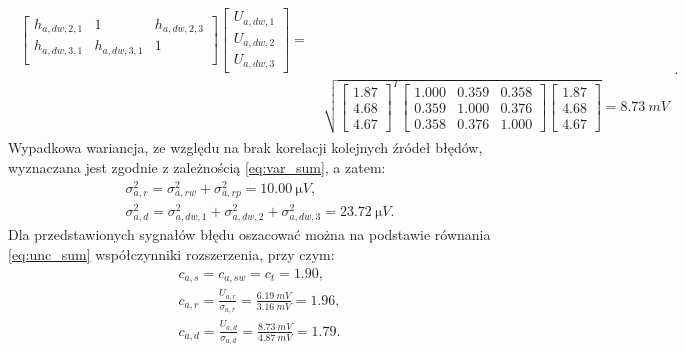 \begin{gather}
\begin{split}
{\begin{bmatrix}
h_{a,dw,2,1} & 1            & h_{a,dw,2,3} \\
h_{a,dw,3,1} & h_{a,dw,3,1} & 1                 \\
\end{bmatrix}
\begin{bmatrix}
U_{a,dw,1} \\ U_{a,dw,2} \\ U_{a,dw,3}
\end{bmatrix}} = ~ \\
& \sqrt{
\begin{bmatrix}
1.87 \\ 4.68 \\ 4.67
\end{bmatrix}^{T}
\begin{bmatrix}
1.000 & 0.359 & 0.358 \\
0.359 & 1.000 & 0.376 \\
0.358 & 0.376 & 1.000
\end{bmatrix}
\begin{bmatrix}
1.87 \\ 4.68 \\ 4.67
\end{bmatrix}} = \qty{8.73}{mV}
\end{split}
\label{eq:sym_parta_uncert_dyn}.
\end{gather}
Wypadkowa wariancja, ze względu na brak korelacji kolejnych źródeł błędów, wyznaczana jest zgodnie z zależnością \eqref{eq:var_sum}, a zatem:
\begin{gather}
\sigma_{a,r}^{2} = \sigma_{a,rw}^{2} + \sigma_{a,rp}^{2} = \qty{10.00}{\micro V} \label{eq:sym_parta_var_rand}, \\
\sigma_{a,d}^{2} = \sigma_{a,dw,1}^{2} + \sigma_{a,dw,2}^{2} + \sigma_{a,dw,3}^{2} = \qty{23.72}{\micro V} \label{eq:sym_parta_var_dyn}.
\end{gather}
Dla przedstawionych sygnałów błędu oszacować można na podstawie równania \eqref{eq:unc_sum} współczynniki rozszerzenia, przy czym:
\begin{gather}
c_{a,s} = c_{a,sw} = c_{t} = 1.90 \label{eq:sym_parta_factor_sta}, \\
c_{a,r} = \frac{U_{a,r}}{\sigma_{a,r}} = \frac{\qty{6.19}{mV}}{\qty{3.16}{mV}} = 1.96 \label{eq:sym_parta_factor_rand}, \\
c_{a,d} = \frac{U_{a,d}}{\sigma_{a,d}} = \frac{\qty{8.73}{mV}}{\qty{4.87}{mV}} = 1.79 \label{eq:sym_parta_factor_dyn}.
\end{gather}

